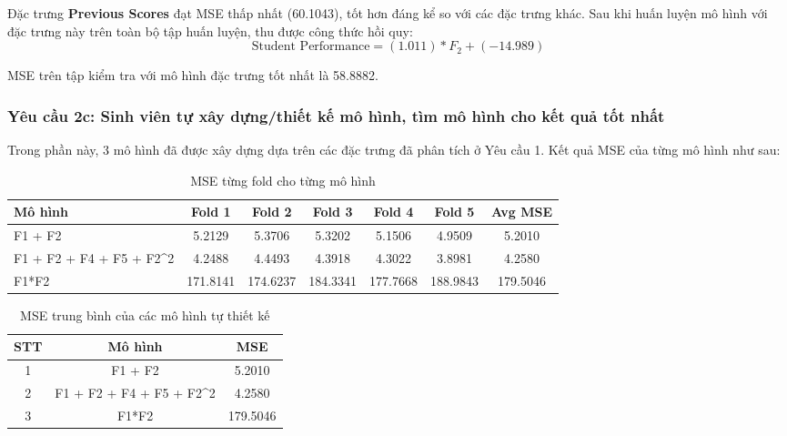 Đặc trưng \textbf{Previous Scores} đạt MSE thấp nhất (60.1043), tốt hơn đáng kể so với các đặc trưng khác. Sau khi huấn luyện mô hình với đặc trưng này trên toàn bộ tập huấn luyện, thu được công thức hồi quy:
$$\text{Student Performance} = (1.011)*F_2 + (-14.989)$$

MSE trên tập kiểm tra với mô hình đặc trưng tốt nhất là 58.8882.

\subsubsection{Yêu cầu 2c:  Sinh viên tự xây dựng/thiết kế mô hình, tìm mô hình cho kết quả tốt nhất}
Trong phần này, 3 mô hình đã được xây dựng dựa trên các đặc trưng đã phân tích ở Yêu cầu 1. Kết quả MSE của từng mô hình như sau:

\begin{table}[htbp]
	\centering
	\caption{MSE từng fold cho từng mô hình}
	\begin{tabular}{|l|c|c|c|c|c|c|}
		\hline
		\textbf{Mô hình}            & \textbf{Fold 1} & \textbf{Fold 2} & \textbf{Fold 3} & \textbf{Fold 4} & \textbf{Fold 5} & \textbf{Avg MSE} \\
		\hline
		F1 + F2                     & 5.2129          & 5.3706          & 5.3202          & 5.1506          & 4.9509          & 5.2010           \\
		\hline
		F1 + F2 + F4 + F5 + F2\^{}2 & 4.2488          & 4.4493          & 4.3918          & 4.3022          & 3.8981          & 4.2580           \\
		\hline
		F1*F2                       & 171.8141        & 174.6237        & 184.3341        & 177.7668        & 188.9843        & 179.5046         \\
		\hline
	\end{tabular}
\end{table}

\begin{table}[htbp]
	\centering
	\caption{MSE trung bình của các mô hình tự thiết kế}
	\begin{tabular}{|c|c|c|}
		\hline
		\textbf{STT} & \textbf{Mô hình}            & \textbf{MSE} \\
		\hline
		1            & F1 + F2                     & 5.2010       \\
		\hline
		2            & F1 + F2 + F4 + F5 + F2\^{}2 & 4.2580       \\
		\hline
		3            & F1*F2                       & 179.5046     \\
		\hline
	\end{tabular}
\end{table}

